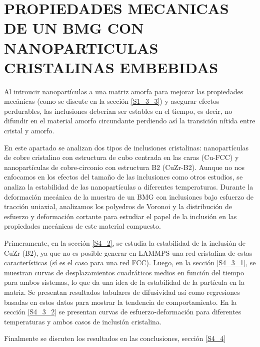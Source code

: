 
\chapter{PROPIEDADES MECANICAS DE UN BMG CON NANOPARTICULAS CRISTALINAS EMBEBIDAS} %

\label{C4} %


Al introucir nanopartículas a una matriz amorfa para mejorar las propiedades mecánicas (como se discute en la sección \ref{S1_3_3}) y asegurar efectos perdurables, las inclusiones deberían ser estables en el tiempo, es decir, no difundir en el material amorfo circundante perdiendo así la transición nítida entre cristal y amorfo.

En este apartado se analizan dos tipos de inclusiones cristalinas: nanopartículas de cobre cristalino con estructura de cubo centrada en las caras (Cu-FCC) y nanopartículas de cobre-circonio con estructura B2 (CuZr-B2). Aunque no nos enfocamos en los efectos del tamaño de las inclusiones como otros estudios, se analiza la estabilidad de las nanopartículas a diferentes temperaturas. Durante la deformación mecánica de la muestra de un BMG con inclusiones bajo esfuerzo de tracción uniaxial, analizamos los polyedros de Voronoi y la distribución de esfuerzo y deformación cortante para estudiar el papel de la inclusión en las propiedades mecánicas de este material compuesto.

Primeramente, en la sección \ref{S4_2}, se estudia la estabilidad de la inclusión de CuZr (B2), ya que no es posible generar en LAMMPS una red cristalina de estas características (sí es el caso para una red FCC). Luego, en la sección \ref{S4_3_1}, se muestran curvas de desplazamientos cuadráticos medios en función del tiempo para ambos sistemas, lo que da una idea de la estabilidad de la partícula en la matriz. Se presentan resultados tabulares de difusividad así como regresiones basadas en estos datos para mostrar la tendencia de comportamiento. En la sección \ref{S4_3_2} se presentan curvas de esfuerzo-deformación para diferentes temperaturas y ambos casos de inclusión cristalina.

Finalmente se discuten los resultados en las conclusiones, sección \ref{S4_4}

